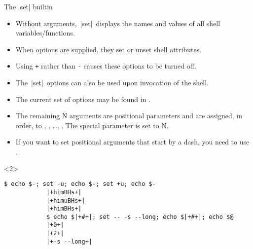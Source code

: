 \begin{frame}[fragile]{The \bash|set| builtin}{}
    \vspace{-4mm}
    \begin{itemize}
        \item Without arguments, \,\bash|set|\, displays the names and values of all shell variables/functions.
        \item When options are supplied, they set or unset shell attributes.
        \item Using \texttt{+} rather than \texttt{-} causes these options to be turned off.
        \item The \,\bash|set|\, options can also be used upon invocation of the shell.
        \item The current set of options may be found in \PB{\texttt{\$-}}.
        \item The remaining N arguments are positional parameters and are assigned, in order, to , , \ldots, .
              The special parameter \PB{\texttt{\#}} is set to N.
        \item If you want to set positional arguments that start by a dash, you need to use \PB{\texttt{-{}-}}.
    \end{itemize}
    \begin{uncoverenv}<2>
        \begin{lstlisting}[style=myBash, aboveskip=2mm]
            $ echo $-; set -u; echo $-; set +u; echo $-
            |+himBHs+|
            |+himuBHs+|
            |+himBHs+|
            $ echo $|+#+|; set -- -s --long; echo $|+#+|; echo $@
            |+0+|
            |+2+|
            |+-s --long+|
        \end{lstlisting}
    \end{uncoverenv}
\end{frame}
